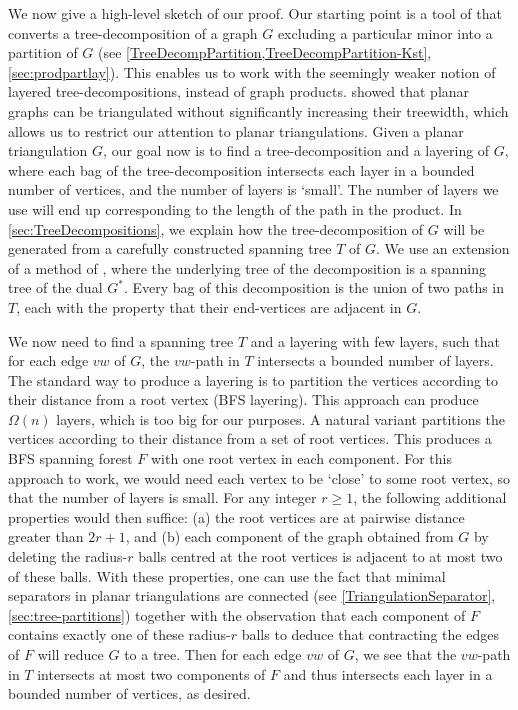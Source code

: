 \documentclass[11pt]{article}
\renewcommand{\geq}{\geqslant}
\theoremstyle{plain}
\theoremstyle{definition}
\begin{document}
    We now give a high-level sketch of our proof. Our starting point is a tool of \citet{ISW24} that converts a tree-decomposition of a graph $G$ excluding a particular minor into a partition of $G$ (see \cref{TreeDecompPartition,TreeDecompPartition-Kst}, \cref{sec:prodpartlay}). This enables us to work with the seemingly weaker notion of layered tree-decompositions, instead of graph products. 
    \citet{BV13} showed that planar graphs can be triangulated without significantly increasing their treewidth, which allows us to restrict our attention to planar triangulations. 
    Given a planar triangulation $G$, our goal now is to find a tree-decomposition and a layering of $G$, where each bag of the tree-decomposition intersects each layer in a bounded number of vertices, and the number of layers is `small'. 
    The number of layers we use will end up corresponding to the length of the path in the product. 
    In \cref{sec:TreeDecompositions}, we explain how the tree-decomposition of $G$ will be generated from a carefully constructed spanning tree $T$ of $G$.
    We use an extension of a method of \citet{Eppstein99}, where the underlying tree of the decomposition is a spanning tree of the dual $G^*$. Every bag of this decomposition is the union of two paths in $T$, each with the property that their end-vertices are adjacent in $G$. 

    We now need to find a spanning tree $T$ and a layering with few layers, such that for each edge $vw$ of $G$, the $vw$-path in $T$ intersects a bounded number of layers. The standard way to produce a layering is to partition the vertices according to their distance from a root vertex (BFS layering). This approach can produce $\Omega(n)$ layers, which is too big for our purposes. A natural variant partitions the vertices according to their distance from a set of root vertices. This produces a BFS spanning forest $F$ with one root vertex in each component. For this approach to work, we would need each vertex to be `close' to some root vertex, so that the number of layers is small. 
    For any integer $r\geq 1$, the following additional properties would then suffice: (a) the root vertices are at pairwise distance greater than $2r+1$, and (b) each component of the graph obtained from $G$ by deleting the radius-$r$ balls centred at the root vertices is adjacent to at most two of these balls.
    With these properties, one can use the fact that minimal separators in planar triangulations are connected (see \cref{TriangulationSeparator}, \cref{sec:tree-partitions}) together with the observation that each component of $F$ contains exactly one of these radius-$r$ balls to deduce that contracting the edges of $F$ will reduce $G$ to a tree.
    Then for each edge $vw$ of $G$, we see that the $vw$-path in $T$ intersects at most two components of $F$ and thus intersects each layer in a bounded number of vertices, as desired. 
    
\end{document}
